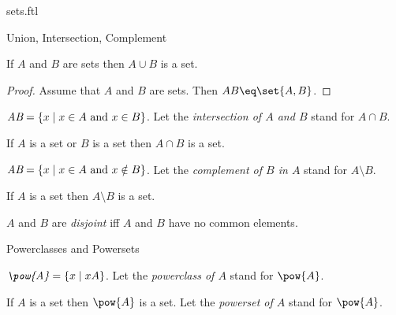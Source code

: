 \documentclass{naproche-library}
\begin{document}
\begin{smodule}[title=Classes and Sets]{sets.ftl}
\begin{sfragment}{Union, Intersection, Complement}
  \begin{forthel}
    \begin{proposition}[id=UnionProp]
      If $A$ and $B$ are sets then $A\cup B$ is a set.
    \end{proposition}
    \begin{proof}
      Assume that $A$ and $B$ are sets.
      Then $A\cup B\eq \bigcup\set{A,B}$.
    \end{proof}
  \end{forthel}

  \begin{definition}[forthel,id=IntersectionDef]
    $\emph{A\cap B}=\{x\mid x\in A\text{ and }x\in B\}$.
    Let the \emph{intersection of $A$ and $B$} stand for $A\cap B$.
  \end{definition}

  \begin{proposition}[forthel,id=IntersectionProp]
    If $A$ is a set or $B$ is a set then $A\cap B$ is a set.
  \end{proposition}

  \begin{definition}[forthel,id=ComplementDef]
    $\emph{A\setminus B}=\{x\mid x\in A\text{ and }x\notin B\}$.
    Let the \emph{complement of $B$ in $A$} stand for $A\setminus B$.
  \end{definition}

  \begin{proposition}[forthel,id=ComplementProp]
    If $A$ is a set then $A\setminus B$ is a set.
  \end{proposition}

  \begin{definition}[forthel,id=DisjointDef]
    $A$ and $B$ are \emph{disjoint} iff $A$ and $B$ have no common elements.
  \end{definition}
\end{sfragment}

\begin{sfragment}{Powerclasses and Powersets}
  \begin{definition}[forthel,id=PowerclassDef]
    $\emph{\pow{A}}=\{x\mid x\subseteq A\}$.
    Let the \emph{powerclass of $A$} stand for $\pow{A}$.
  \end{definition}

  \begin{axiom}[forthel,title=Powerset Axiom,id=PowersetAx]
    If $A$ is a set then $\pow{A}$ is a set.
    Let the \emph{powerset of $A$} stand for $\pow{A}$.
  \end{axiom}
\end{sfragment}


\end{smodule}
\end{document}
